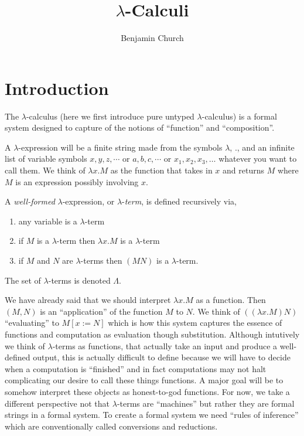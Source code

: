 \documentclass[12pt]{article}
\begin{document}
\author{Benjamin Church}
\title{\Huge $\lambda$-Calculi}

\section{Introduction}


The $\lambda$-calculus (here we first introduce pure untyped $\lambda$-calculus) is a formal system designed to capture of the notions of ``function'' and ``composition''.

\begin{rmk}
A $\lambda$-expression will be a finite string made from the symbols $\lambda$, $.$, and an infinite list of variable symbols $x, y, z, \cdots$ or $a,b,c, \cdots$ or $x_1, x_2, x_3, \dots$ whatever you want to call them. We think of $\lambda x . M$ as the function that takes in $x$ and returns $M$ where $M$ is an expression possibly involving $x$. 
\end{rmk} 

\begin{defn}
A \textit{well-formed} $\lambda$-expression, or $\lambda$-\textit{term}, is defined recursively via,
\begin{enumerate}
\item any variable is a $\lambda$-term
\item if $M$ is a $\lambda$-term then $\lambda x . M$ is a $\lambda$-term
\item if $M$ and $N$ are $\lambda$-terms then $(M N)$ is a $\lambda$-term.
\end{enumerate}
The set of $\lambda$-terms is denoted $\Lambda$.
\end{defn}

\begin{rmk}
We have already said that we should interpret $\lambda x . M$ as a function. Then $(M, N)$ is an ``application'' of the function $M$ to $N$. We think of $((\lambda x . M) N)$ ``evaluating'' to $M[x := N]$ which is how this system captures the essence of functions and computation as evaluation though substitution. Although intutively we think of $\lambda$-terms as functions, that actually take an input and produce a well-defined output, this is actually difficult to define because we will have to decide when a computation is ``finished'' and in fact computations may not halt complicating our desire to call these things functions. A major goal will be to somehow interpret these objects as honest-to-god functions. For now, we take a different perspective not that $\lambda$-terms are ``machines'' but rather they are formal strings in a formal system. To create a formal system we need ``rules of inference'' which are conventionally called conversions and reductions.
\end{rmk}
\end{document}
